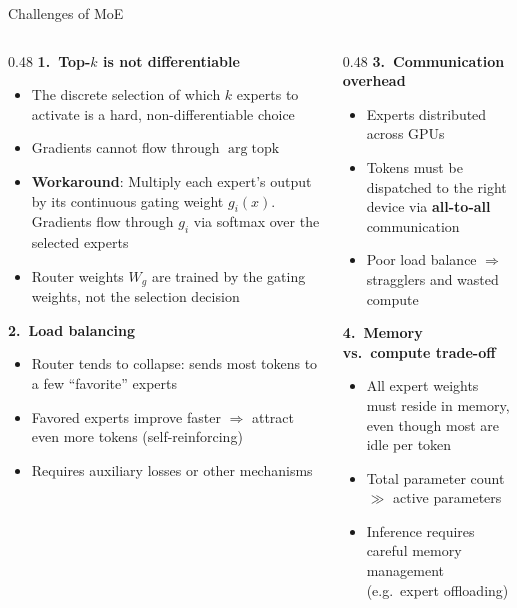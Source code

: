 \begin{frame}{Challenges of MoE}

  \begin{columns}
    \begin{column}{0.48\textwidth}
      \textbf{1.\ Top-$k$ is not differentiable}
      \begin{itemize}
        \item The discrete selection of which $k$ experts to activate is a hard, non-differentiable choice
        \item Gradients cannot flow through $\arg\!\mathrm{topk}$
        \item \textbf{Workaround}: Multiply each expert's output by its continuous gating weight $g_i(x)$. Gradients flow through $g_i$ via softmax over the selected experts
        \item Router weights $W_g$ are trained by the gating weights, not the selection decision
      \end{itemize}

      \vspace{0.3em}
      \textbf{2.\ Load balancing}
      \begin{itemize}
        \item Router tends to collapse: sends most tokens to a few ``favorite'' experts
        \item Favored experts improve faster $\Rightarrow$ attract even more tokens (self-reinforcing)
        \item Requires auxiliary losses or other mechanisms
      \end{itemize}
    \end{column}
    \begin{column}{0.48\textwidth}
      \textbf{3.\ Communication overhead}
      \begin{itemize}
        \item Experts distributed across GPUs
        \item Tokens must be dispatched to the right device via \textbf{all-to-all} communication
        \item Poor load balance $\Rightarrow$ stragglers and wasted compute
      \end{itemize}

      \vspace{0.3em}
      \textbf{4.\ Memory vs.\ compute trade-off}
      \begin{itemize}
        \item All expert weights must reside in memory, even though most are idle per token
        \item Total parameter count $\gg$ active parameters
        \item Inference requires careful memory management (e.g.\ expert offloading)
      \end{itemize}


\end{column}
\end{columns}
\end{frame}

